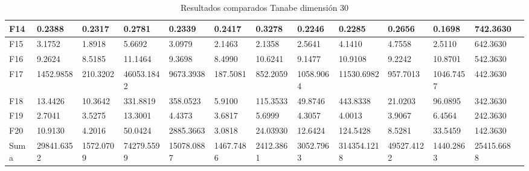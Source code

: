 \documentclass[12pt,a4paper]{article}
\begin{document}
\begin{table}[!h]
{\begin{tabular}{ | l | l | l | l | l | l | l | l | l | l | l | l | l | }
				F14 & 0.2388 & 0.2317 & 0.2781 & 0.2339 & 0.2417 & 0.3278 & 0.2246 & 0.2285 & 0.2656 & 0.1698 & 742.3630 \\ \hline
				F15 & 3.1752 & 1.8918 & 5.6692 & 3.0979 & 2.1463 & 2.1358 & 2.5641 & 4.1410 & 4.7558 & 2.5110 & 642.3630 \\ \hline
				F16 & 9.2624 & 8.5185 & 11.1464 & 9.3698 & 8.4990 & 10.6241 & 9.1477 & 10.9108 & 9.2242 & 10.8701 & 542.3630 \\ \hline
				F17 & 1452.9858 & 210.3202 & 46053.1842 & 9673.3938 & 187.5081 & 852.2059 & 1058.9064 & 11530.6982 & 957.7013 & 1046.7457 & 442.3630 \\ \hline
				F18 & 13.4426 & 10.3642 & 331.8819 & 358.0523 & 5.9100 & 115.3533 & 49.8746 & 443.8338 & 21.0203 & 96.0895 & 342.3630 \\ \hline
				F19 & 2.7041 & 3.5275 & 13.3001 & 4.4373 & 3.6817 & 5.6999 & 4.3057 & 4.0013 & 3.9067 & 6.4564 & 242.3630 \\ \hline
				F20 & 10.9130 & 4.2016 & 50.0424 & 2885.3663 & 3.0818 & 24.03930 & 12.6424 & 124.5428 & 8.5281 & 33.5459 & 142.3630 \\ \hline
				Suma & 29841.6352 & 1572.0709 & 74279.5599 & 15078.0887 & 1467.7486 & 2412.3861 & 3052.7963 & 314354.1218 & 49527.4122 & 1440.2863 & 25415.6688 \\ \hline
			\end{tabular}
		}
		\label{tablaTANABE-D30}
		\caption{Resultados comparados Tanabe dimensión 30}
	\end{table}
	
\end{document}

